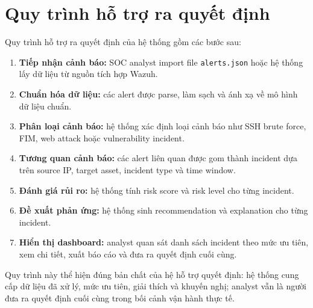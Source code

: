 \documentclass[a4paper,12pt,oneside]{book}
\begin{document}
\section{Quy trình hỗ trợ ra quyết định}
{\fontsize{13pt}{15.6pt}\selectfont

Quy trình hỗ trợ ra quyết định của hệ thống gồm các bước sau:

\begin{enumerate}
    \item \textbf{Tiếp nhận cảnh báo:} SOC analyst import file \texttt{alerts.json} hoặc hệ thống lấy dữ liệu từ nguồn tích hợp Wazuh.
    \item \textbf{Chuẩn hóa dữ liệu:} các alert được parse, làm sạch và ánh xạ về mô hình dữ liệu chuẩn.
    \item \textbf{Phân loại cảnh báo:} hệ thống xác định loại cảnh báo như SSH brute force, FIM, web attack hoặc vulnerability incident.
    \item \textbf{Tương quan cảnh báo:} các alert liên quan được gom thành incident dựa trên source IP, target asset, incident type và time window.
    \item \textbf{Đánh giá rủi ro:} hệ thống tính risk score và risk level cho từng incident.
    \item \textbf{Đề xuất phản ứng:} hệ thống sinh recommendation và explanation cho từng incident.
    \item \textbf{Hiển thị dashboard:} analyst quan sát danh sách incident theo mức ưu tiên, xem chi tiết, xuất báo cáo và đưa ra quyết định cuối cùng.
\end{enumerate}

\noindent Quy trình này thể hiện đúng bản chất của hệ hỗ trợ quyết định: hệ thống cung cấp dữ liệu đã xử lý, mức ưu tiên, giải thích và khuyến nghị; analyst vẫn là người đưa ra quyết định cuối cùng trong bối cảnh vận hành thực tế.

}
\end{document}

